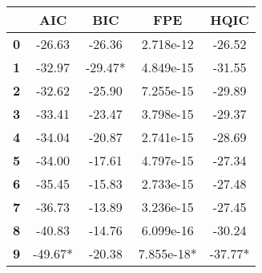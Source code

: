 \documentclass{report}
\begin{document}
\begin{center}
\begin{tabular}{lcccc}
\toprule
           & \textbf{AIC} & \textbf{BIC} & \textbf{FPE} & \textbf{HQIC}  \\
\midrule
\textbf{0} &      -26.63  &      -26.36  &   2.718e-12  &       -26.52   \\
\textbf{1} &      -32.97  &     -29.47*  &   4.849e-15  &       -31.55   \\
\textbf{2} &      -32.62  &      -25.90  &   7.255e-15  &       -29.89   \\
\textbf{3} &      -33.41  &      -23.47  &   3.798e-15  &       -29.37   \\
\textbf{4} &      -34.04  &      -20.87  &   2.741e-15  &       -28.69   \\
\textbf{5} &      -34.00  &      -17.61  &   4.797e-15  &       -27.34   \\
\textbf{6} &      -35.45  &      -15.83  &   2.733e-15  &       -27.48   \\
\textbf{7} &      -36.73  &      -13.89  &   3.236e-15  &       -27.45   \\
\textbf{8} &      -40.83  &      -14.76  &   6.099e-16  &       -30.24   \\
\textbf{9} &     -49.67*  &      -20.38  &  7.855e-18*  &      -37.77*   \\
\bottomrule
\end{tabular}
\end{center}
\end{document}
